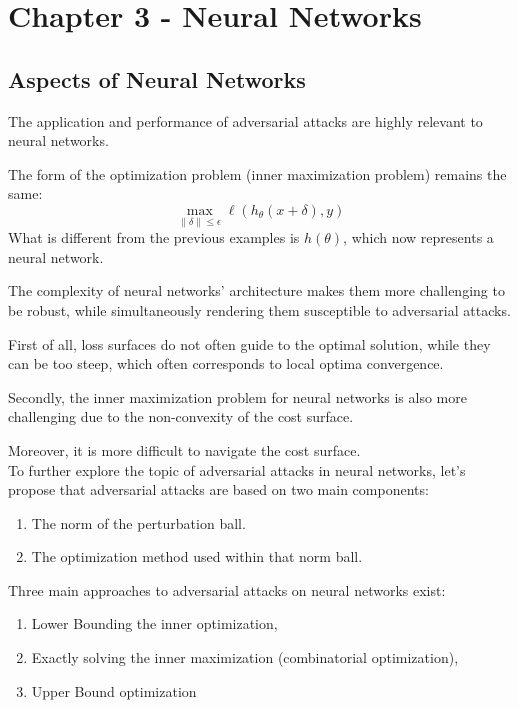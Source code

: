 \section{Chapter 3 - Neural Networks}

\subsection{Aspects of Neural Networks}

The application and performance of adversarial attacks are highly relevant to neural networks.

The form of the optimization problem (inner maximization problem) remains the same:
\[\max_{\|\delta\|\leq\epsilon} \ell(h_{\theta}(x + \delta), y)\]    
What is different from the previous examples is $h(\theta)$, which now represents a neural network.

The complexity of neural networks' architecture makes them more challenging to be robust, while simultaneously rendering them susceptible to adversarial attacks.

First of all, loss surfaces do not often guide to the optimal solution, while they can be too steep, which often corresponds to local optima convergence.

Secondly, the inner maximization problem for neural networks is also more challenging due to the non-convexity of the cost surface.

Moreover, it is more difficult to navigate the cost surface.\\

To further explore the topic of adversarial attacks in neural networks, let's propose that adversarial attacks are based on two main components:

\begin{enumerate}
\item The norm of the perturbation ball.
\item The optimization method used within that norm ball.\\
\end{enumerate}

Three main approaches to adversarial attacks on neural networks exist: 
\begin{enumerate}
    \item Lower Bounding the inner optimization, 
    \item Exactly solving the inner maximization (combinatorial optimization), 
    \item Upper Bound optimization
\end{enumerate}


